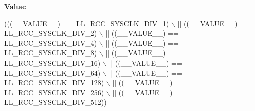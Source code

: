 {\bfseries Value\+:}
\begin{DoxyCode}
(((\_\_VALUE\_\_) == LL\_RCC\_SYSCLK\_DIV\_1)   \(\backslash\)
                                        || ((\_\_VALUE\_\_) == LL\_RCC\_SYSCLK\_DIV\_2)   \(\backslash\)
                                        || ((\_\_VALUE\_\_) == LL\_RCC\_SYSCLK\_DIV\_4)   \(\backslash\)
                                        || ((\_\_VALUE\_\_) == LL\_RCC\_SYSCLK\_DIV\_8)   \(\backslash\)
                                        || ((\_\_VALUE\_\_) == LL\_RCC\_SYSCLK\_DIV\_16)  \(\backslash\)
                                        || ((\_\_VALUE\_\_) == LL\_RCC\_SYSCLK\_DIV\_64)  \(\backslash\)
                                        || ((\_\_VALUE\_\_) == LL\_RCC\_SYSCLK\_DIV\_128) \(\backslash\)
                                        || ((\_\_VALUE\_\_) == LL\_RCC\_SYSCLK\_DIV\_256) \(\backslash\)
                                        || ((\_\_VALUE\_\_) == LL\_RCC\_SYSCLK\_DIV\_512))
\end{DoxyCode}
